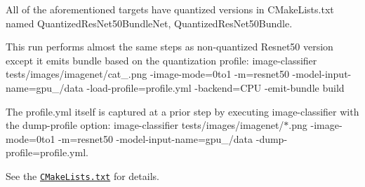 All of the aforementioned targets have quantized versions in C\+Make\+Lists.\+txt named {\ttfamily Quantized\+Res\+Net50\+Bundle\+Net}, {\ttfamily Quantized\+Res\+Net50\+Bundle}.

This run performs almost the same steps as non-\/quantized Resnet50 version except it emits bundle based on the quantization profile\+: {\ttfamily image-\/classifier tests/images/imagenet/cat\+\_.\+png -\/image-\/mode=0to1 -\/m=resnet50 -\/model-\/input-\/name=gpu\+\_/data -\/load-\/profile=profile.\+yml -\/backend=C\+PU -\/emit-\/bundle build}

The {\ttfamily profile.\+yml} itself is captured at a prior step by executing image-\/classifier with the {\ttfamily dump-\/profile} option\+: {\ttfamily image-\/classifier tests/images/imagenet/$\ast$.png -\/image-\/mode=0to1 -\/m=resnet50 -\/model-\/input-\/name=gpu\+\_/data -\/dump-\/profile=profile.\+yml}.

See the \href{../examples/bundles/resnet50/CMakeLists.txt}{\tt C\+Make\+Lists.\+txt} for details. 